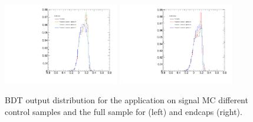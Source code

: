 \begin{figure}
  \centering
  \includegraphics[width=0.45\textwidth]{Figures/ApplicationBDTOutput_BsMCBarrel.pdf}
  \includegraphics[width=0.45\textwidth]{Figures/ApplicationBDTOutput_BsMCEndcaps.pdf}
  \caption{BDT output distribution for the application on \BsMuMu signal MC different control samples and the full sample for (left) and endcaps (right).}
  \label{fig:applicationBDTOutputEndcaps}
\end{figure}


